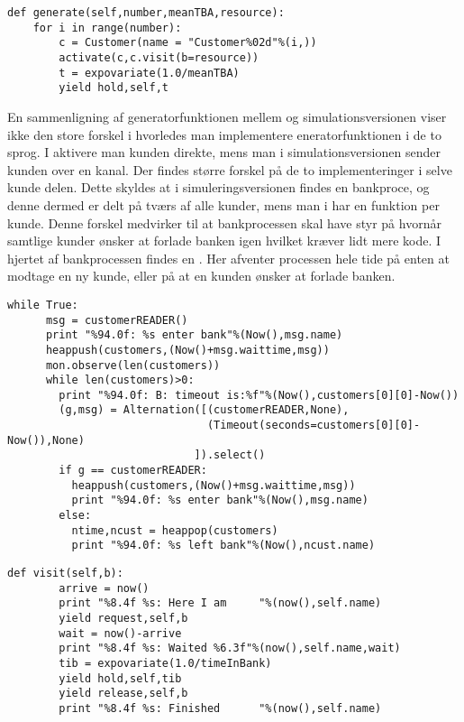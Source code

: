 \begin{lstlisting}[firstnumber=11, label=fig:simpy:generator, caption=Generator funktion for simpy]
def generate(self,number,meanTBA,resource):         
    for i in range(number):
        c = Customer(name = "Customer%02d"%(i,))
        activate(c,c.visit(b=resource))              
        t = expovariate(1.0/meanTBA)               
        yield hold,self,t
\end{lstlisting}

En sammenligning af generatorfunktionen mellem \simpy og simulationsversionen viser ikke den store forskel i hvorledes  man  implementere eneratorfunktionen i de to sprog. I \simpy aktivere man kunden direkte, mens man i simulationsversionen sender kunden over en kanal. Der findes større forskel på de to implementeringer i selve kunde delen. Dette skyldes at i simuleringsversionen findes en bankproce, og denne dermed er delt på tværs af alle kunder, mens man i \simpy har en funktion per kunde. Denne forskel medvirker til at bankprocessen skal have styr på hvornår samtlige kunder ønsker at forlade banken igen hvilket kræver lidt mere kode. I hjertet af bankprocessen findes en . Her afventer processen hele tide på enten at modtage en ny kunde, eller på at en kunden ønsker at forlade banken.
\begin{lstlisting}[firstnumber=39,float=hbtp, label=fig:sim:bank, caption= Uddrag af bank processen i simulation]
    while True:
      msg = customerREADER()
      print "%94.0f: %s enter bank"%(Now(),msg.name)
      heappush(customers,(Now()+msg.waittime,msg))
      mon.observe(len(customers))
      while len(customers)>0:
        print "%94.0f: B: timeout is:%f"%(Now(),customers[0][0]-Now())
        (g,msg) = Alternation([(customerREADER,None),
                               (Timeout(seconds=customers[0][0]- Now()),None)
                             ]).select()
        if g == customerREADER:
          heappush(customers,(Now()+msg.waittime,msg))
          print "%94.0f: %s enter bank"%(Now(),msg.name)
        else:
          ntime,ncust = heappop(customers)
          print "%94.0f: %s left bank"%(Now(),ncust.name) 
\end{lstlisting}
\begin{lstlisting}[firstnumber=20 ,float=hbtp, label=fig:simpy:customer, caption=funktionen \code{visit} i \simpy]
     def visit(self,b):                                
        arrive = now()
        print "%8.4f %s: Here I am     "%(now(),self.name)
        yield request,self,b                          
        wait = now()-arrive
        print "%8.4f %s: Waited %6.3f"%(now(),self.name,wait)
        tib = expovariate(1.0/timeInBank)            
        yield hold,self,tib                          
        yield release,self,b                         
        print "%8.4f %s: Finished      "%(now(),self.name)
\end{lstlisting}
